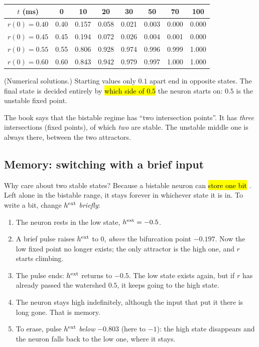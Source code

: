 \begin{example}[Where does the neuron end up? ($\hext=-0.5$, $\tau=10$\,ms)]
\begin{center}
\renewcommand{\arraystretch}{1.2}
\begin{tabular}{c|ccccccc}
$t$ (ms) & 0 & 10 & 20 & 30 & 50 & 70 & 100\\\hline
$r(0)=0.40$ & 0.40 & 0.157 & 0.058 & 0.021 & 0.003 & 0.000 & 0.000\\
$r(0)=0.45$ & 0.45 & 0.194 & 0.072 & 0.026 & 0.004 & 0.001 & 0.000\\
$r(0)=0.55$ & 0.55 & 0.806 & 0.928 & 0.974 & 0.996 & 0.999 & 1.000\\
$r(0)=0.60$ & 0.60 & 0.843 & 0.942 & 0.979 & 0.997 & 1.000 & 1.000\\
\end{tabular}
\end{center}
(Numerical solutions.) Starting values only $0.1$ apart end in opposite states. The final state is decided entirely by \hl{which side of $0.5$} the neuron starts on: $0.5$ is the unstable fixed point.
\end{example}

\begin{pitfall}
The book says that the bistable regime has ``two intersection points''. It has \emph{three} intersections (fixed points), of which \emph{two} are stable. The unstable middle one is always there, between the two attractors.
\end{pitfall}

\subsection{Memory: switching with a brief input}

Why care about two stable states? Because a bistable neuron can \hl{store one bit} . Left alone in the bistable range, it stays forever in whichever state it is in.
To write a bit, change $h^{\text{ext}}$ \emph{briefly}:

\begin{enumerate}
  \item The neuron rests in the low state, $\hext=-0.5$.
  \item A brief pulse raises $h^{\text{ext}}$ to $0$, \emph{above} the bifurcation point $-0.197$. Now the low fixed point no longer exists; the only attractor is the high one, and $r$ starts climbing.
  \item The pulse ends: $h^{\text{ext}}$ returns to $-0.5$. The low state exists again, but if $r$ has already passed the watershed $0.5$, it keeps going to the high state.
  \item The neuron stays high indefinitely, although the input that put it there is long gone. That is memory.
  \item To erase, pulse $h^{\text{ext}}$ \emph{below} $-0.803$ (here to $-1$): the high state disappears and the neuron falls back to the low one, where it stays.
\end{enumerate}

